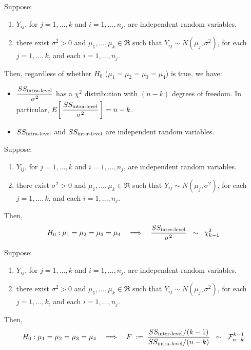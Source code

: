 \documentclass{article}
\begin{document}
\begin{proposition}
\mbox{}\vskip 0.15cm\noindent
Suppose:
\begin{enumerate}
\item  $Y_{ij}$, for $j = 1, \ldots, k$ and $i = 1, \ldots, n_{j}$, are independent random variables.
\item  there exist $\sigma^{2} > 0$ and $\mu_{1}, \ldots, \mu_{k} \in \Re$ such that $Y_{ij} \sim N(\mu_{j},\sigma^{2})$, for each $j = 1, \ldots, k$, and each $i = 1, \ldots, n_{j}$.
\end{enumerate}
Then, regardless of whether $H_{0}$ ($\mu_{1} = \mu_{2} = \mu_{3} = \mu_{4}$) is true, we have:
\begin{itemize}
\item  $\dfrac{SS_{\textnormal{intra-level}}}{\sigma^{2}}$ has a $\chi^{2}$ distribution with $(n - k)$ degrees of freedom.
          In particular, $E\!\left[\,\dfrac{SS_{\textnormal{intra-level}}}{\sigma^{2}}\,\right] = n-k$.
\item  $SS_{\textnormal{intra-level}}$ and $SS_{\textnormal{inter-level}}$ are independent random variables.
\end{itemize}
\end{proposition}

\begin{proposition}\quad
\mbox{}\vskip 0.15cm\noindent
Suppose:
\begin{enumerate}
\item  $Y_{ij}$, for $j = 1, \ldots, k$ and $i = 1, \ldots, n_{j}$, are independent random variables.
\item  there exist $\sigma^{2} > 0$ and $\mu_{1}, \ldots, \mu_{k} \in \Re$ such that $Y_{ij} \sim N(\mu_{j},\sigma^{2})$, for each $j = 1, \ldots, k$, and each $i = 1, \ldots, n_{j}$.
\end{enumerate}
Then,
\begin{equation*}
H_{0}:\mu_{1} = \mu_{2} = \mu_{3} = \mu_{4}
\quad\Longrightarrow\quad
\dfrac{SS_{\textnormal{inter-level}}}{\sigma^{2}} \;\; \sim \;\; \chi^{2}_{k-1}
\end{equation*}
\end{proposition}

\begin{corollary}
\mbox{}\vskip 0.15cm\noindent
Suppose:
\begin{enumerate}
\item  $Y_{ij}$, for $j = 1, \ldots, k$ and $i = 1, \ldots, n_{j}$, are independent random variables.
\item  there exist $\sigma^{2} > 0$ and $\mu_{1}, \ldots, \mu_{k} \in \Re$ such that $Y_{ij} \sim N(\mu_{j},\sigma^{2})$, for each $j = 1, \ldots, k$, and each $i = 1, \ldots, n_{j}$.
\end{enumerate}
Then,
\begin{equation*}
H_{0}:\mu_{1} = \mu_{2} = \mu_{3} = \mu_{4}
\quad\Longrightarrow\quad
F \;:=\; \dfrac{SS_{\textnormal{inter-level}}/(k-1)}{SS_{\textnormal{intra-level}}/(n-k)} \;\; \sim \;\; \mathcal{F}^{k-1}_{n-k}
\end{equation*}
\end{corollary}
\end{document}
